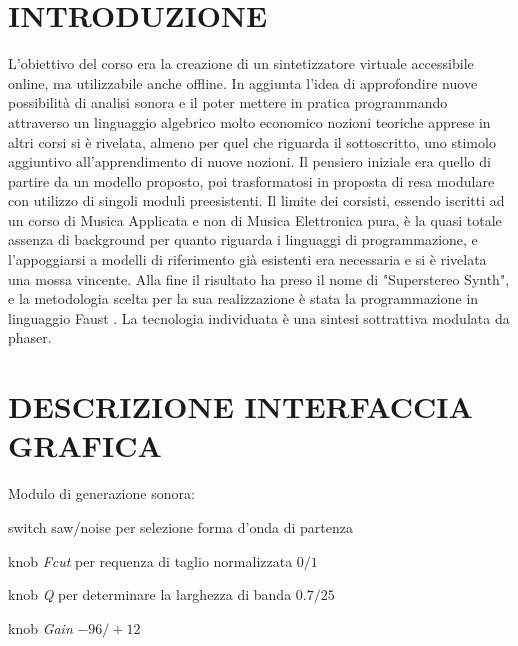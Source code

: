 \documentclass[
	a4paper,
	twocolumn
	]{article}
\begin{document}
\maketitle
\thispagestyle{empty}
\section*{INTRODUZIONE}

L’obiettivo del corso era la creazione di un sintetizzatore virtuale accessibile
online, ma utilizzabile anche offline. In aggiunta l'idea di approfondire nuove
possibilità di analisi sonora e il poter mettere in pratica programmando
attraverso un linguaggio algebrico molto economico nozioni teoriche apprese
in altri corsi si è rivelata, almeno per quel che riguarda il
sottoscritto, uno stimolo aggiuntivo all'apprendimento di nuove nozioni. Il
pensiero iniziale era quello di partire da un modello proposto, poi
trasformatosi in proposta di resa modulare con utilizzo di singoli moduli
preesistenti. Il limite dei corsisti, essendo iscritti ad un corso di Musica
Applicata e non di Musica Elettronica pura, è la quasi totale assenza di
background per quanto riguarda i linguaggi di programmazione, e l'appoggiarsi a
modelli di riferimento già esistenti era necessaria e si è rivelata una mossa
vincente.
Alla fine il risultato ha preso il nome di "Superstereo Synth", e la metodologia
scelta per la sua realizzazione è stata la programmazione in linguaggio Faust
\cite{faust}. La tecnologia individuata è una sintesi sottrattiva modulata
da phaser.

\section*{DESCRIZIONE INTERFACCIA GRAFICA}

\noindent Modulo di generazione sonora:

\begin{compactitem}
  \item switch saw/noise per selezione forma d’onda di partenza
  \item knob \emph{Fcut} per requenza di taglio normalizzata $0/1$
  \item knob \emph{Q} per determinare la larghezza di banda $0.7/25$
  \item knob \emph{Gain} $-96/+12$
\end{compactitem}
\end{document}
